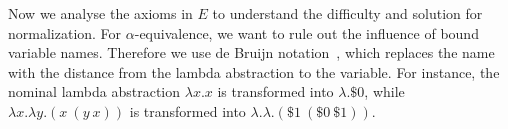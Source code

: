 


Now we analyse the axioms in $E$ to understand the difficulty and solution for normalization. 
For $\alpha$-equivalence, we want to rule out the influence of bound variable names. Therefore we use de Bruijn notation~\cite{deBruijn1972lambda}, which replaces the name with the distance from the lambda abstraction to the variable. For instance, the nominal lambda abstraction \( \lambda x. x \) is transformed into \( \lambda . \$0 \), while \( \lambda x. \lambda y. (x\ (y\ x)) \) is transformed into \( \lambda.\lambda. (\$1\ (\$0\ \$1)) \).

